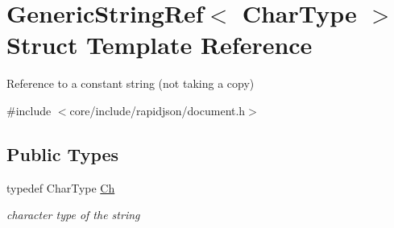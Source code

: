 \hypertarget{structGenericStringRef}{}\section{Generic\+String\+Ref$<$ Char\+Type $>$ Struct Template Reference}
\label{structGenericStringRef}


Reference to a constant string (not taking a copy)  




{\ttfamily \#include $<$core/include/rapidjson/document.\+h$>$}

\subsection*{Public Types}
\begin{DoxyCompactItemize}
\item 
typedef Char\+Type \hyperlink{structGenericStringRef_a16908c3fce41be380061330c14ba2140}{Ch}
\begin{DoxyCompactList}\small\item\em character type of the string \end{DoxyCompactList}\end{DoxyCompactItemize}
